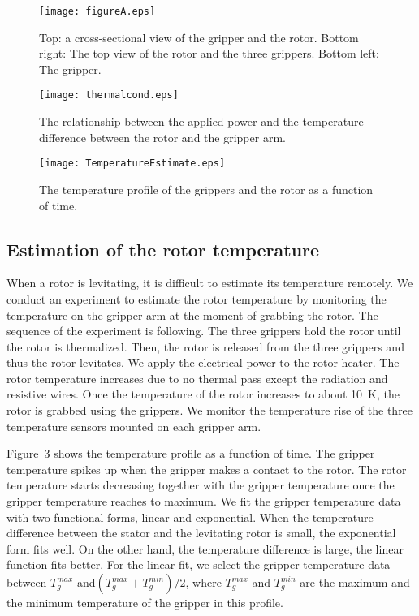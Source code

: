 \documentclass[journal]{IEEEtran}
\begin{document}
\begin{figure}[htb]
   \centering
   \texttt{[image: figureA.eps]} %
   \caption{Top: a cross-sectional view of the gripper and the rotor. Bottom right: The top view of the rotor and the three grippers. Bottom left: The gripper.}
   \label{fig:figureA}
\end{figure}

\begin{figure}[htb]
   \centering
   \texttt{[image: thermalcond.eps]} %
   \caption{The relationship between the applied power and the temperature difference between the rotor and the gripper arm. }
   \label{fig:thermalcond}
\end{figure}

\begin{figure}[htb]
   \centering
   \texttt{[image: TemperatureEstimate.eps]} %
   \caption{The temperature profile of the grippers and the rotor as a function of time. }
   \label{fig:TemperatureEstimate}
\end{figure}

\subsection{Estimation of the rotor temperature}
When a rotor is levitating, it is difficult to estimate its temperature remotely.
We conduct an experiment to estimate the rotor temperature by monitoring the temperature on the gripper arm at the moment of grabbing the rotor.
The sequence of the experiment is following.
The three grippers hold the rotor until the rotor is thermalized.
Then, the rotor is released from the three grippers and thus the rotor levitates.
We apply the electrical power to the rotor heater.
The rotor temperature increases due to no thermal pass except the radiation and resistive wires.
Once the temperature of the rotor increases to about 10~K, the rotor is grabbed using the grippers.
We monitor the temperature rise of the three temperature sensors mounted on each gripper arm.

Figure~\ref{fig:TemperatureEstimate} shows the temperature profile as a function of time.
The gripper temperature spikes up when the gripper makes a contact to the rotor.
The rotor temperature starts decreasing together with the gripper temperature once the gripper temperature reaches to maximum.
We fit the gripper temperature data with two functional forms, linear and exponential.
When the temperature difference between the stator and the levitating rotor is small, the exponential form fits well.
On the other hand, the temperature difference is large, the linear function fits better.
For the linear fit, we select the gripper temperature data between $T_g^{max}$ and$(T_g^{max}+T_g^{min})/2$,
where $T_g^{max}$ and $T_g^{min}$ are the maximum and the minimum temperature of the gripper in this profile.
\end{document}
